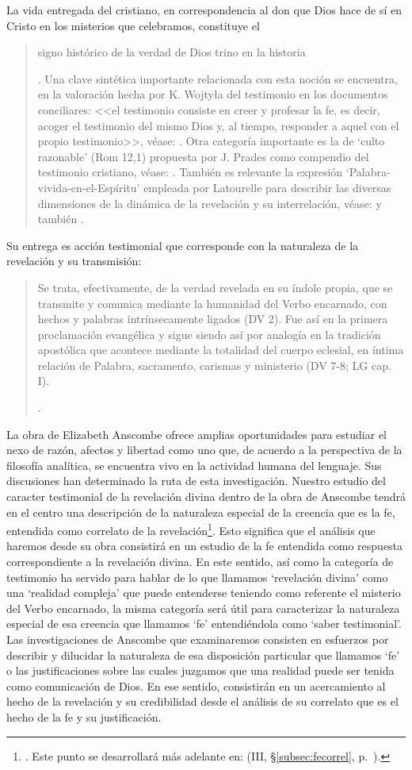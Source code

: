 La vida entregada del cristiano, en correspondencia al don que Dios hace de sí en Cristo en  los misterios que celebramos, constituye el \blockquote[{\Cite[Cf.][399]{prades2015testimonio}. Una clave sintética importante relacionada con esta noción se encuentra, en la valoración hecha por K. Wojtyła del testimonio en los documentos conciliares: <<el testimonio consiste en creer y profesar la fe, es decir, acoger el testimonio del mismo Dios y, al tiempo, responder a aquel con el propio testimonio>>, véase: \Cite[194-197]{prades2015testimonio}. Otra categoría importante es la de \enquote*{culto razonable} (Rom 12,1) propuesta por J. Prades como compendio del testimonio cristiano, véase: \Cite[405-430]{prades2015testimonio}. También es relevante la expresión \enquote*{Palabra-vivida-en-el-Espíritu} empleada por Latourelle para describir las diversas dimensiones de la dinámica de la revelación y su interrelación, véase: \Cite[Cf.][110]{latourelle1975et} y también \Cite[582]{ninot2009tf}.}]{signo histórico de la verdad de Dios trino en la historia}. Su entrega es acción testimonial que corresponde con la naturaleza de la revelación y su transmisión:
\blockquote[{\Cite[419-420]{prades2015testimonio}}.]{Se trata, efectivamente, de la verdad revelada en su índole propia, que se transmite y comunica mediante la humanidad del Verbo encarnado, con hechos y palabras intrínsecamente ligados (DV 2). Fue así en la primera proclamación evangélica y sigue siendo así por analogía en la tradición apostólica que acontece mediante la totalidad del cuerpo eclesial, en íntima relación de Palabra, sacramento, carismas y ministerio (DV 7-8; LG cap. I).}

La obra de Elizabeth Anscombe ofrece amplias oportunidades para estudiar el nexo de razón, afectos y libertad como uno que, de acuerdo a la perspectiva de la filosofía analítica, se encuentra vivo en la actividad humana del lenguaje. Sus discusiones han determinado la ruta de esta investigación. Nuestro estudio del caracter testimonial de la revelación divina dentro de la obra de Anscombe tendrá en el centro una descripción de la naturaleza especial de la creencia que es la fe, entendida como correlato de la revelación\footnote{\Cite[Cf.][185]{conesa1994cc}. Este punto se desarrollará más adelante en: (III, \S\ref{subsec:fecorrel}, p.~\pageref{subsec:fecorrel}).}. Esto significa que el análisis que haremos desde su obra consistirá en un estudio de la fe entendida como respuesta correspondiente a la revelación divina. En este sentido, así como la categoría de testimonio ha servido para hablar de lo que llamamos `revelación divina' como una `realidad compleja' que puede entenderse teniendo como referente el misterio del Verbo encarnado, la misma categoría será útil para caracterizar la naturaleza especial de esa creencia que llamamos `fe' entendiéndola como `saber testimonial'. Las investigaciones de Anscombe que examinaremos consisten en esfuerzos por describir y dilucidar la naturaleza de esa disposición particular que llamamos `fe' o las justificaciones sobre las cuales juzgamos que una realidad puede ser tenida como comunicación de Dios. En ese sentido, consistirán en un acercamiento al hecho de la revelación y su credibilidad desde el análisis de su correlato que es el hecho de la fe y su justificación. 

